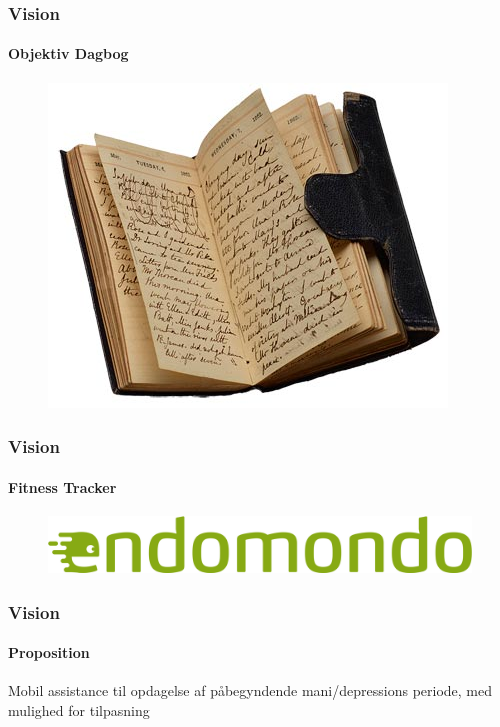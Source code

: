 \begin{frame}
\frametitle{Vision}
\framesubtitle{Objektiv Dagbog}
\begin{figure}
	\includegraphics[scale=0.5]{graphics/diary}
\end{figure}
\end{frame}

\begin{frame}
\frametitle{Vision}
\framesubtitle{Fitness Tracker}
\begin{figure}
	\includegraphics[scale=0.3]{graphics/fitnesstracker}
\end{figure}
\end{frame}

\begin{frame}
\frametitle{Vision}
\framesubtitle{Proposition}
\begin{center}
Mobil assistance til opdagelse af påbegyndende mani/depressions periode, med mulighed for tilpasning
\end{center}
\end{frame}